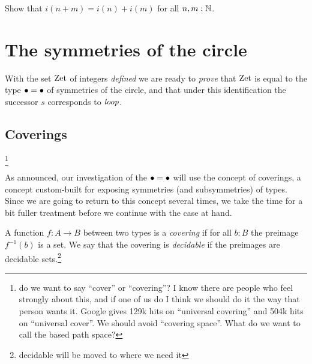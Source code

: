 \begin{xca}\label{xca:addition-on-Z-and-N}
Show that $i(n+m)=i(n)+i(m)$ for all $n,m:\mathbb{N}$.
\end{xca}

\section{The symmetries of the circle}
\label{sec:pi1S1isZ}

With the set $\mathrm{Zet}$ of integers \emph{defined} we are ready to \emph{prove} that $\mathrm{Zet}$ is equal to the type $\bullet=\bullet$ of symmetries of the circle, and that under this identification the successor $s$ corresponds to $\mathit{loop}$.


\subsection{Coverings}\footnote{do we want to say ``cover'' or ``covering''?  I know there are people who feel strongly about this, and if one of us do I think we should do it the way that person wants it.  Google gives 129k hits on ``universal covering'' and 504k hits on ``universal cover''.  We should avoid ``covering space''.  What do we want to call the based path space?}
\label{sec:covering}



As announced, our investigation of the $\bullet=\bullet$ will use the concept of coverings, a concept custom-built for exposing symmetries (and subsymmetries) of types.  Since we are going to return to this concept several times, we take the time for a bit fuller treatment before we continue with the case at hand.

\begin{definition}
  \label{def:covering}
  A function $f:A\to B$ between two types is a \emph{covering} if for all $b:B$ the preimage $f^{-1}(b)$ is a  set.  We say that the covering is \emph{decidable} if the preimages are decidable sets.\footnote{decidable will be moved to where we need it}
\end{definition}

